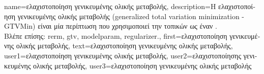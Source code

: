 {name={\foreignlanguage{greek}{ελαχιστοποίηση γενικευμένης ολικής μεταβολής}},
	description={\foreignlanguage{greek}{Η ελαχιστοποίηση γενικευμένης ολικής 
		μεταβολής} 
		(generalized total variation minimization - GTVMin) \foreignlanguage{greek}{είναι μία περίπτωση} 
		 \foreignlanguage{greek}{που χρησιμοποιεί την}  
		\foreignlanguage{greek}{τοπικών}  
		\foreignlanguage{greek}{ως έναν}  \cite{ClusteredFLTVMinTSP}.
		\\
		\foreignlanguage{greek}{Βλέπε επίσης:} \gls{rerm}, \gls{gtv}, \gls{modelparam}, \gls{regularizer}.},
	first={\foreignlanguage{greek}{ελαχιστοποίηση γενικευμένης ολικής μεταβολής}},
	text={\foreignlanguage{greek}{ελαχιστοποίηση γενικευμένης ολικής μεταβολής}},
	user1={\foreignlanguage{greek}{ελαχιστοποίηση γενικευμένης ολικής μεταβολής}}, %
    	user2={\foreignlanguage{greek}{ελαχιστοποίησης γενικευμένης ολικής μεταβολής}}, %
	user3={\foreignlanguage{greek}{ελαχιστοποίηση γενικευμένης ολικής μεταβολής}} %
}

